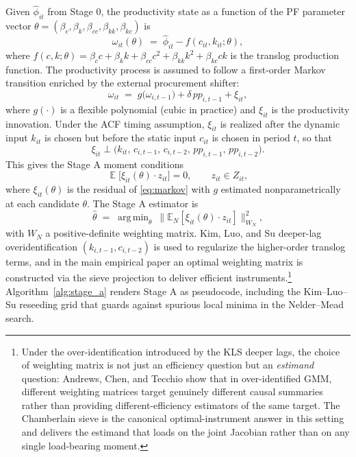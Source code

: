 \documentclass[11pt]{article}
\DeclareMathOperator{\E}{\mathbb{E}}
\DeclareMathOperator*{\argmin}{arg\,min}
\begin{document}
Given $\hat\phi_{it}$ from Stage 0, the productivity state as a function of the PF parameter vector $\theta = (\beta_c,\beta_k,\beta_{cc},\beta_{kk},\beta_{kc})$ is
\begin{equation}\label{eq:omega}
\omega_{it}(\theta) \;=\; \hat\phi_{it} - f(c_{it},k_{it};\theta),
\end{equation}
where $f(c,k;\theta) = \beta_c c + \beta_k k + \beta_{cc} c^2 + \beta_{kk} k^2 + \beta_{kc} ck$ is the translog production function. The productivity process is assumed to follow a first-order Markov transition enriched by the external procurement shifter:
\begin{equation}\label{eq:markov}
\omega_{it} \;=\; g\bigl(\omega_{i,t-1}\bigr) + \delta\, pp_{i,t-1} + \xi_{it},
\end{equation}
where $g(\cdot)$ is a flexible polynomial (cubic in practice) and $\xi_{it}$ is the productivity innovation. Under the ACF timing assumption, $\xi_{it}$ is realized after the dynamic input $k_{it}$ is chosen but before the static input $c_{it}$ is chosen in period $t$, so that
\begin{equation}\label{eq:timing}
\xi_{it} \perp \bigl(k_{it},\,c_{i,t-1},\,c_{i,t-2},\,pp_{i,t-1},\,pp_{i,t-2}\bigr).
\end{equation}
This gives the Stage A moment conditions
\begin{equation}\label{eq:gmm_pf}
\E\bigl[\xi_{it}(\theta)\cdot z_{it}\bigr] = 0, \qquad z_{it} \in Z_{it},
\end{equation}
where $\xi_{it}(\theta)$ is the residual of \eqref{eq:markov} with $g$ estimated nonparametrically at each candidate $\theta$. The Stage A estimator is
\begin{equation}\label{eq:theta_hat}
\hat\theta \;=\; \argmin_\theta\ \bigl\|\mathbb{E}_N[\xi_{it}(\theta)\cdot z_{it}]\bigr\|_{W_N}^2,
\end{equation}
with $W_N$ a positive-definite weighting matrix. Kim, Luo, and Su \citep{KimLuoSu2019JAE} deeper-lag overidentification $(k_{i,t-1}, c_{i,t-2})$ is used to regularize the higher-order translog terms, and in the main empirical paper an optimal weighting matrix is constructed via the \citet{Chamberlain1987} sieve projection to deliver efficient instruments.\footnote{Under the over-identification introduced by the KLS deeper lags, the choice of weighting matrix is not just an efficiency question but an \emph{estimand} question: Andrews, Chen, and Tecchio \cite{AndrewsChenTecchio2026} show that in over-identified GMM, different weighting matrices target genuinely different causal summaries rather than providing different-efficiency estimators of the same target. The Chamberlain sieve is the canonical optimal-instrument answer in this setting and delivers the estimand that loads on the joint Jacobian rather than on any single load-bearing moment.} Algorithm~\ref{alg:stage_a} renders Stage A as pseudocode, including the Kim--Luo--Su reseeding grid that guards against spurious local minima in the Nelder--Mead search.
\end{document}
